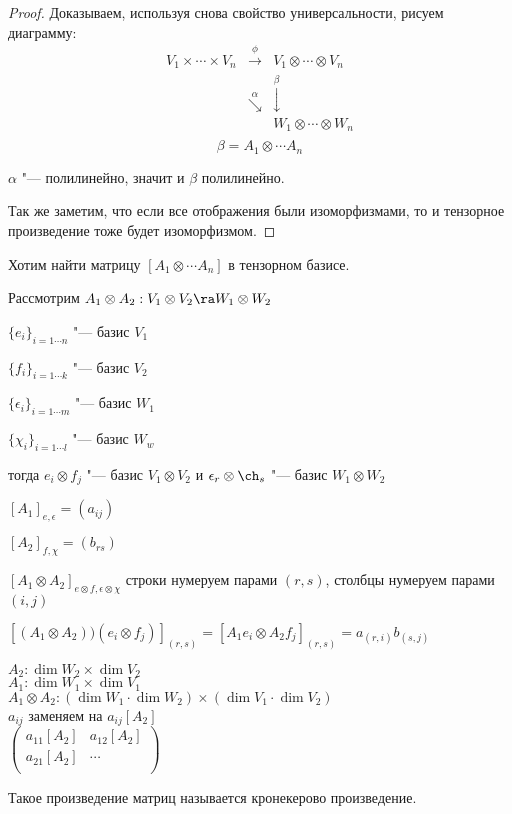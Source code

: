 \begin{proof}
    Доказываем, используя снова свойство универсальности, рисуем диаграмму:
    $$
    \begin{matrix}
    V_1 \times \cdots \times V_n  & \overset{\phi}{\rightarrow}& V_1 \otimes \cdots \otimes V_n\\
    &\overset{\alpha}{\searrow}&\overset{\beta}{\downarrow}\\
    &&W_1 \otimes \cdots \otimes W_n\\
    \end{matrix}
    $$
    $$\beta =  A_1 \otimes \cdots A_n$$
    
    $\alpha$ "--- полилинейно, значит и $\beta$ полилинейно. 

    Так же заметим, что если все отображения были изоморфизмами, то 
    и тензорное произведение тоже будет изоморфизмом.    
\end{proof}

    Хотим найти матрицу $[A_1 \otimes \cdots A_n]$ в тензорном базисе.

    Рассмотрим $A_1 \otimes A_2: V_1 \otimes V_2 \ra W_1 \otimes W_2$
   
    $\{e_i\}_{i=1\cdots n}$ "--- базис $V_1$

    $\{f_i\}_{i=1\cdots k}$ "--- базис $V_2$

    $\{\epsilon_i\}_{i=1\cdots m}$ "--- базис $W_1$

    $\{\chi_i\}_{i=1\cdots l}$ "--- базис $W_w$

    тогда $e_i \otimes f_j$ "--- базис $V_1 \otimes V_2$ и $\epsilon_r \otimes \ch_s$ "--- базис $W_1 \otimes W_2$

    $[A_1]_{e, \epsilon} = (a_{ij})$

    $[A_2]_{f, \chi} = (b_{rs})$

    $[A_1 \otimes A_2]_{e \otimes f, \epsilon \otimes \chi}$ строки нумеруем парами $(r, s)$, столбцы нумеруем парами $(i, j)$

    $[(A_1 \otimes A_2))(e_i \otimes f_j)]_{(r, s)} = [A_1e_i \otimes A_2f_j]_{(r,s)} = a_{(r, i)}b_{(s, j)}$

    $A_2 \colon \dim W_2 \times \dim V_2$\\
    $A_1 \colon \dim W_1 \times \dim V_1$\\
    $A_1 \otimes A_2 \colon (\dim W_1 \cdot \dim W_2)\times (\dim V_1 \cdot \dim V_2)$\\
    $a_{ij}$ заменяем на $a_{ij}[A_2]$\\

    $\begin{pmatrix}
        a_{11}[A_2] & a_{12}[A_2]\\
        a_{21}[A_2] & \cdots\\
    \end{pmatrix}$

   Такое произведение матриц называется кронекерово произведение.